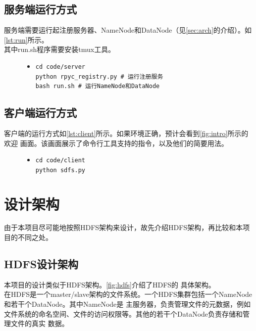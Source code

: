 \documentclass[a4paper]{article}
\begin{document}
\subsection{服务端运行方式}
服务端需要运行起注册服务器、NameNode和DataNode（见\autoref{sec:arch}的介绍）。如\autoref{lst:run}所示。\\

其中run.sh程序需要安装tmux工具。
\begin{figure}[!hbt]
\begin{itemize}
\item[] \begin{lstlisting}[style=mybash, label=lst:run, caption=测试环境下服务端的运行方式]
cd code/server
python rpyc_registry.py # 运行注册服务
bash run.sh # 运行NameNode和DataNode
\end{lstlisting}
\end{itemize}
\end{figure}

\subsection{客户端运行方式}
客户端的运行方式如\autoref{lst:client}所示。如果环境正确，预计会看到\autoref{fig:intro}所示的欢迎
画面。该画面展示了命令行工具支持的指令，以及他们的简要用法。
\begin{figure}[!hbt]
\begin{itemize}
\item[] \begin{lstlisting}[style=mybash, label=lst:client, caption=客户端运行方式]
cd code/client
python sdfs.py
\end{lstlisting}
\end{itemize}
\end{figure}

\section{设计架构}\label{sec:arch}
由于本项目尽可能地按照HDFS架构来设计，故先介绍HDFS架构，再比较和本项目的不同之处。
\subsection{HDFS设计架构}
本项目的设计类似于HDFS架构。\autoref{fig:hdfs}介绍了HDFS的
具体架构。\\

在HDFS是一个master/slave架构的文件系统。一个HDFS集群包括一个NameNode和若干个DataNode。其中NameNode是
主服务器，负责管理文件的元数据，例如文件系统的命名空间、文件的访问权限等。其他的若干个DataNode负责存储和管理文件的真实
数据。\\
\end{document}
